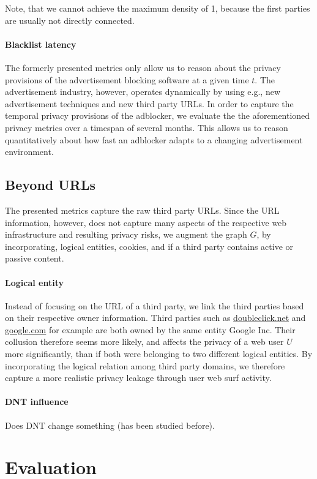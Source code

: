 \documentclass{sig-alternate}
\begin{document}
Note, that we cannot achieve the maximum density of 1, because the first parties are usually not directly connected.

\paragraph{Blacklist latency}
The formerly presented metrics only allow us to reason about the privacy provisions of the advertisement blocking software at a given time $t$. The advertisement industry, however, operates dynamically by using e.g., new advertisement techniques and new third party URLs. In order to capture the temporal privacy provisions of the adblocker, we evaluate the the aforementioned privacy metrics over a timespan of several months. This allows us to reason quantitatively about how fast an adblocker adapts to a changing advertisement environment.

\subsection{Beyond URLs}
The presented metrics capture the raw third party URLs. Since the URL information, however, does not capture many aspects of the respective web infrastructure and resulting privacy risks, we augment the graph $G$, by incorporating, logical entities, cookies, and if a third party contains active or passive content.

\paragraph{Logical entity}
Instead of focusing on the URL of a third party, we link the third parties based on their respective owner information. Third parties such as \url{doubleclick.net} and \url{google.com} for example are both owned by the same entity Google Inc. Their collusion therefore seems more likely, and affects the privacy of a web user $U$ more significantly, than if both were belonging to two different logical entities. By incorporating the logical relation among third party domains, we therefore capture a more realistic privacy leakage through user web surf activity.

\paragraph{DNT influence}
Does DNT change something (has been studied before).

\section{Evaluation}
\end{document}

